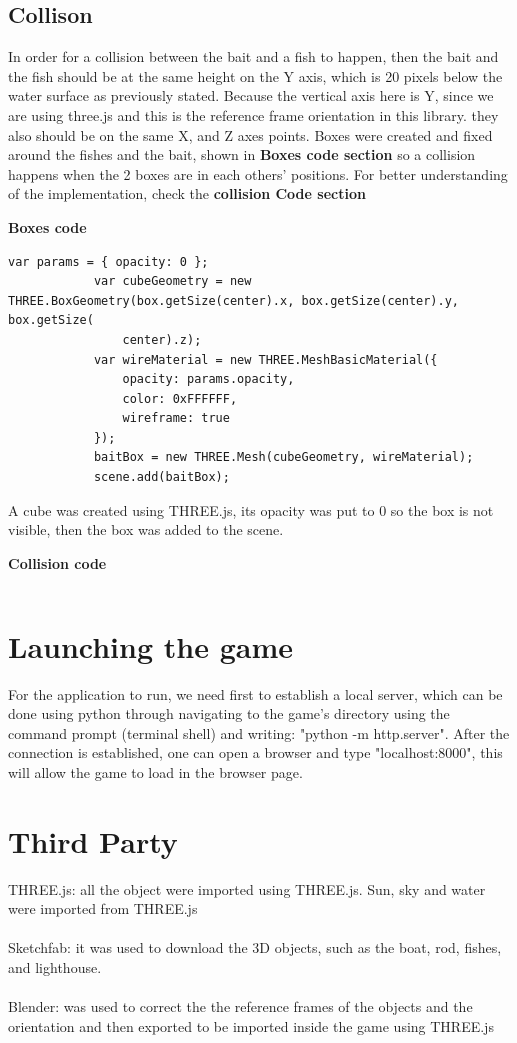 \documentclass[paper=a4, fontsize=11pt]{scrartcl} %
\numberwithin{equation}{section} %
\numberwithin{figure}{section} %
\numberwithin{table}{section} %
\begin{document}
\subsection{Collison}

In order for a collision between the bait and a fish to happen, then the bait and the fish should be at the same height on the Y axis, which is 20 pixels below the water surface as previously stated. Because the vertical axis here is Y, since we are using three.js and this is the reference frame orientation in this library. they also should be on the same X, and Z axes points. Boxes were created and fixed around the fishes and the bait, shown in \textbf{Boxes code section} so a collision happens when the 2 boxes are in each others' positions. For better understanding of the implementation, check the \textbf{collision Code section} \newline

\textbf{Boxes code}
\begin{lstlisting}
var params = { opacity: 0 };
            var cubeGeometry = new THREE.BoxGeometry(box.getSize(center).x, box.getSize(center).y, box.getSize(
                center).z);
            var wireMaterial = new THREE.MeshBasicMaterial({
                opacity: params.opacity,
                color: 0xFFFFFF,
                wireframe: true
            });
            baitBox = new THREE.Mesh(cubeGeometry, wireMaterial);
            scene.add(baitBox);
\end{lstlisting}
A cube was created using THREE.js, its opacity was put to 0 so the box is not visible, then the box was added to the scene.
\newline
\par
\textbf{Collision code}
\begin{lstlisting}

\end{lstlisting}
\section{Launching the game}

For the application to run, we need first to establish a local server, which can be done using python through navigating to the game's directory using the command prompt (terminal shell) and writing: "python -m http.server". After the connection is established, one can open a browser and type "localhost:8000", this will allow the game to load in the browser page.

\section{Third Party}

THREE.js: all the object were imported using THREE.js. Sun, sky and water were imported from THREE.js
\\~\\
Sketchfab: it was used to download the 3D objects, such as the boat, rod, fishes, and lighthouse.
\\~\\
Blender: was used to correct the the reference frames of the objects and the orientation and then exported to be imported inside the game using THREE.js
\end{document}
